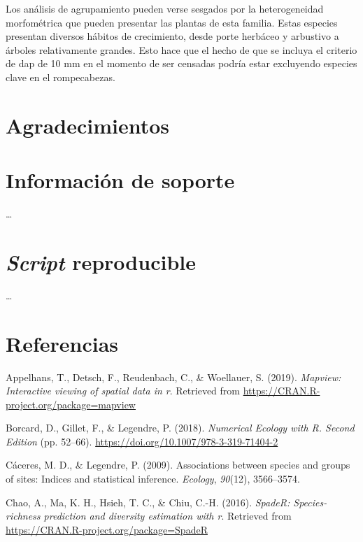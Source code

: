 \documentclass[11pt,]{article}
\begin{document}
Los análisis de agrupamiento pueden verse sesgados por la heterogeneidad
morfométrica que pueden presentar las plantas de esta familia. Estas
especies presentan diversos hábitos de crecimiento, desde porte herbáceo
y arbustivo a árboles relativamente grandes. Esto hace que el hecho de
que se incluya el criterio de dap de 10 mm en el momento de ser censadas
podría estar excluyendo especies clave en el rompecabezas.

\section{Agradecimientos}\label{agradecimientos}

\section{Información de soporte}\label{informaciuxf3n-de-soporte}

\ldots

\section{\texorpdfstring{\emph{Script}
reproducible}{Script reproducible}}\label{script-reproducible}

\ldots

\section*{Referencias}\label{referencias}

\hypertarget{refs}{}
\hypertarget{ref-cita_mapview}{}
Appelhans, T., Detsch, F., Reudenbach, C., \& Woellauer, S. (2019).
\emph{Mapview: Interactive viewing of spatial data in r}. Retrieved from
\url{https://CRAN.R-project.org/package=mapview}

\hypertarget{ref-borcard_legendre}{}
Borcard, D., Gillet, F., \& Legendre, P. (2018). \emph{Numerical Ecology
with R. Second Edition} (pp. 52--66).
\url{https://doi.org/10.1007/978-3-319-71404-2}

\hypertarget{ref-caceres2009associations}{}
Cáceres, M. D., \& Legendre, P. (2009). Associations between species and
groups of sites: Indices and statistical inference. \emph{Ecology},
\emph{90}(12), 3566--3574.

\hypertarget{ref-spader_chao}{}
Chao, A., Ma, K. H., Hsieh, T. C., \& Chiu, C.-H. (2016). \emph{SpadeR:
Species-richness prediction and diversity estimation with r}. Retrieved
from \url{https://CRAN.R-project.org/package=SpadeR}
\end{document}
